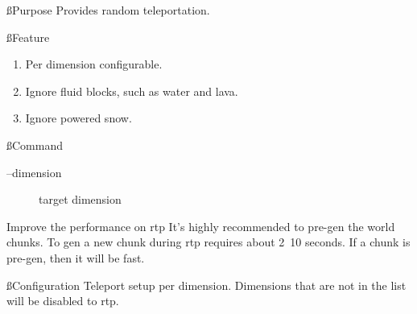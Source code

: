 
\ss{Purpose}
Provides random teleportation.

\ss{Feature}
\begin{enumerate}
    \item Per dimension configurable.
    \item Ignore fluid blocks, such as water and lava.
    \item Ignore powered snow.
\end{enumerate}

\ss{Command}
\begin{description}
    \item [--dimension] target dimension
\end{description}

\begin{tips}{Improve the performance on rtp}
    It's highly recommended to pre-gen the world chunks.
    To gen a new chunk during rtp requires about 2~10 seconds.
    If a chunk is pre-gen, then it will be fast.
\end{tips}

\ss{Configuration}
Teleport setup per dimension.
Dimensions that are not in the list will be disabled to rtp.




